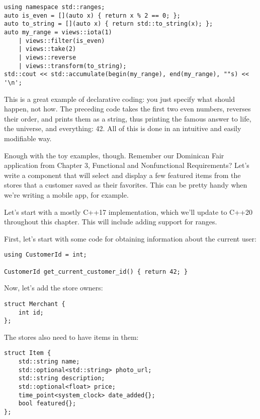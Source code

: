 \begin{lstlisting}[style=styleCXX]
using namespace std::ranges;
auto is_even = [](auto x) { return x % 2 == 0; };
auto to_string = [](auto x) { return std::to_string(x); };
auto my_range = views::iota(1)
	| views::filter(is_even)
	| views::take(2)
	| views::reverse
	| views::transform(to_string);
std::cout << std::accumulate(begin(my_range), end(my_range), ""s) << '\n';
\end{lstlisting}

This is a great example of declarative coding: you just specify what should happen, not how. The preceding code takes the first two even numbers, reverses their order, and prints them as a string, thus printing the famous answer to life, the universe, and everything: 42. All of this is done in an intuitive and easily modifiable way.


Enough with the toy examples, though. Remember our Dominican Fair application from Chapter 3, Functional and Nonfunctional Requirements? Let's write a component that will select and display a few featured items from the stores that a customer saved as their favorites. This can be pretty handy when we're writing a mobile app, for example.

Let's start with a mostly C++17 implementation, which we'll update to C++20 throughout this chapter. This will include adding support for ranges.

First, let's start with some code for obtaining information about the current user:

\begin{lstlisting}[style=styleCXX]
using CustomerId = int;

CustomerId get_current_customer_id() { return 42; }
\end{lstlisting}

Now, let's add the store owners:

\begin{lstlisting}[style=styleCXX]
struct Merchant {
	int id;
};
\end{lstlisting}

The stores also need to have items in them:

\begin{lstlisting}[style=styleCXX]
struct Item {
	std::string name;
	std::optional<std::string> photo_url;
	std::string description;
	std::optional<float> price;
	time_point<system_clock> date_added{};
	bool featured{};
};
\end{lstlisting}

